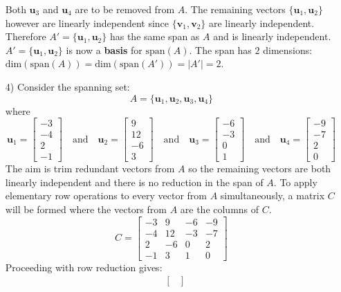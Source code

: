 \documentclass{article}
\begin{document}
\begin{itemize}
Both \(\mathbf{u}_3\) and \(\mathbf{u}_4\) are to be removed from \(A\). The remaining vectors \(\{\mathbf{u}_1, \mathbf{u}_2\}\) however are linearly independent since \(\{\mathbf{v}_1, \mathbf{v}_2\}\) are linearly independent. Therefore \(A' = \{\mathbf{u}_1, \mathbf{u}_2\}\) has the same span as \(A\) and is linearly independent. \(A' = \{\mathbf{u}_1, \mathbf{u}_2\}\) is now a {\bf basis} for \(\text{span}(A)\). The span has \(2\) dimensions: \(\text{dim}(\text{span}(A)) = \text{dim}(\text{span}(A')) = |A'| = 2\).
\item[4)] Consider the spanning set:
\[A = \{\mathbf{u}_1, \mathbf{u}_2, \mathbf{u}_3, \mathbf{u}_4\}\]
where
\[\mathbf{u}_1 = \begin{bmatrix}
-3 \\ -4 \\ 2 \\ -1   
\end{bmatrix} \quad\text{and}\quad \mathbf{u}_2 =\begin{bmatrix} 
9 \\ 12 \\ -6 \\ 3 
\end{bmatrix} \quad\text{and}\quad \mathbf{u}_3 = \begin{bmatrix} 
-6 \\ -3 \\ 0 \\ 1 
\end{bmatrix} \quad\text{and}\quad \mathbf{u}_4 = \begin{bmatrix} 
-9 \\ -7 \\ 2 \\ 0 
\end{bmatrix}\] 
The aim is trim redundant vectors from \(A\) so the remaining vectors are both linearly independent and there is no reduction in the span of \(A\). To apply elementary row operations to every vector from \(A\) simultaneously, a matrix \(C\) will be formed where the vectors from \(A\) are the columns of \(C\).
\[C = \begin{bmatrix}
-3 &   9 & -6 & -9 \\
-4 & 12 & -3 & -7 \\
 2 &  -6 &  0 &  2 \\ 
-1 &   3 &  1 &  0 
\end{bmatrix}\]
Proceeding with row reduction gives:
\begin{align*}
& \begin{bmatrix}

\end{bmatrix}
\end{align*}
\end{itemize}
\end{document}
